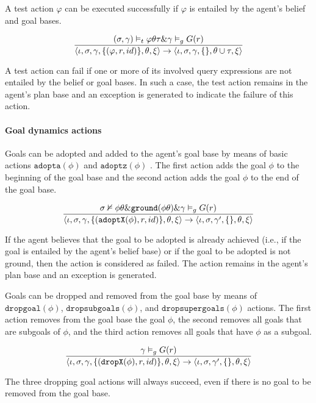 \documentclass[a4paper]{article}
\begin{document}
A test action $\varphi$ can be executed successfully if $\varphi$ is entailed by the agent's belief and goal bases.

$$ {{( \sigma, \gamma) \vDash_{t} \varphi \theta \tau \& \gamma \vDash_{g} G(r)}\over{\langle \iota, \sigma, \gamma, \{(\varphi, r, id)\}, \theta, \xi \rangle  \rightarrow \langle \iota, \sigma, \gamma, \{\}, \theta \cup \tau, \xi \rangle}} $$

A test action can fail if one or more of its involved query expressions are not entailed by the belief or goal bases. In such a case, the test action remains in the agent's plan base and an exception is generated to indicate the failure of this action.

\paragraph{Goal dynamics actions}

Goals can be adopted and added to the agent's goal base by means of basic actions $\texttt{adopta}(\phi)$ and $\texttt{adoptz}(\phi)$ . The first action adds the goal $\phi$ to the beginning of the goal base and the second action adds the goal $\phi$ to the end of the goal base.

$$ {{{\sigma \nvDash \phi \theta} \& {\texttt{ground}(\phi \theta)} \& {\gamma \vDash_{g} G(r)}}\over{\langle \iota, \sigma, \gamma, \{(\texttt{adoptX}(\phi), r, id)\}, \theta, \xi \rangle  \rightarrow \langle \iota, \sigma, \gamma', \{\}, \theta, \xi \rangle}} $$

If the agent believes that the goal to be adopted is already achieved (i.e., if the goal is entailed by the agent's belief base) or if the goal to be adopted is not ground, then the action is considered as failed. The action remains in the agent’s plan base and an exception is generated.

Goals can be dropped and removed from the goal base by means of $\texttt{dropgoal}(\phi)$, $\texttt{dropsubgoals}(\phi)$, and $\texttt{dropsupergoals}(\phi)$ actions. The first action removes from the goal base the goal $\phi$, the second removes all goals that are subgoals of $\phi$, and the third action removes all goals that have $\phi$ as a subgoal.

$$ {{\gamma \vDash_{g} G(r)} \over {\langle \iota, \sigma, \gamma, \{(\texttt{dropX}(\phi), r, id)\}, \theta, \xi \rangle  \rightarrow \langle \iota, \sigma, \gamma', \{\}, \theta, \xi \rangle}} $$

The three dropping goal actions will always succeed, even if there is no goal to be removed from the goal base.
\end{document}

